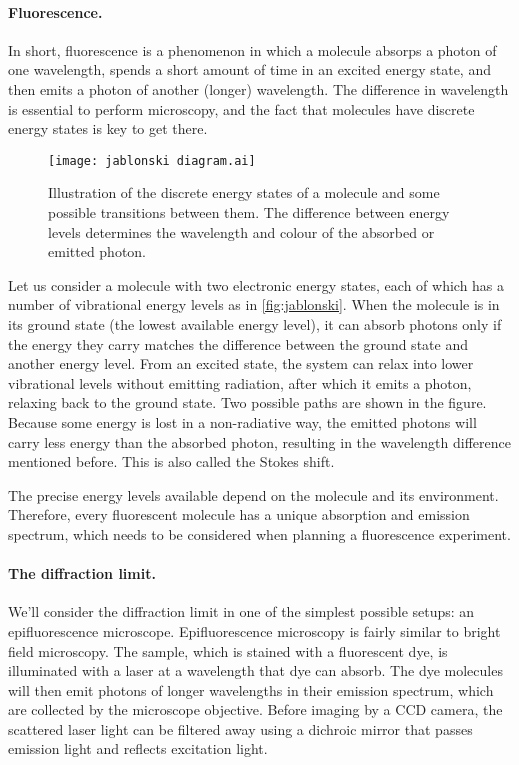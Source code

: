 \paragraph{Fluorescence.} In short, fluorescence is a phenomenon in which a molecule absorps a photon of one wavelength, spends a short amount of time in an excited energy state, and then emits a photon of another (longer) wavelength. The difference in wavelength is essential to perform microscopy, and the fact that molecules have discrete energy states is key to get there.

\begin{figure}
	\centering
	\texttt{[image: jablonski diagram.ai]}
	\caption{
		Illustration of the discrete energy states of a molecule and some possible transitions between them. The difference between energy levels determines the wavelength and colour of the absorbed or emitted photon.
	}
	\label{fig:jablonski}
\end{figure}

Let us consider a molecule with two electronic energy states, each of which has a number of vibrational energy levels as in \autoref{fig:jablonski}. When the molecule is in its ground state (the lowest available energy level), it can absorb photons only if the energy they carry matches the difference between the ground state and another energy level. From an excited state, the system can relax into lower vibrational levels without emitting radiation, after which it emits a photon, relaxing back to the ground state. Two possible paths are shown in the figure. Because some energy is lost in a non-radiative way, the emitted photons will carry less energy than the absorbed photon, resulting in the wavelength difference mentioned before. This is also called the Stokes shift. 

The precise energy levels available depend on the molecule and its environment. Therefore, every fluorescent molecule has a unique absorption and emission spectrum, which needs to be considered when planning a fluorescence experiment.

\paragraph{The diffraction limit.} We'll consider the diffraction limit in one of the simplest possible setups: an epifluorescence microscope. Epifluorescence microscopy is fairly similar to bright field microscopy. The sample, which is stained with a fluorescent dye, is illuminated with a laser at a wavelength that dye can absorb. The dye molecules will then emit photons of longer wavelengths in their emission spectrum, which are collected by the microscope objective. Before imaging by a CCD camera, the scattered laser light can be filtered away using a dichroic mirror that passes emission light and reflects excitation light. 

